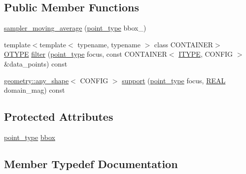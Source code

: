 \subsection*{Public Member Functions}
\begin{DoxyCompactItemize}
\item 
\hyperlink{classmui_1_1sampler__moving__average_a01579f1073f49e7104cc781e84754a65}{sampler\+\_\+moving\+\_\+average} (\hyperlink{classmui_1_1sampler__moving__average_ae687f5cbf78af76e22bf97845f386300}{point\+\_\+type} bbox\+\_\+)
\item 
{\footnotesize template$<$template$<$ typename, typename $>$ class C\+O\+N\+T\+A\+I\+N\+ER$>$ }\\\hyperlink{classmui_1_1sampler__moving__average_af5b1ae5cd60a907dbbd1f3fe978263dd}{O\+T\+Y\+PE} \hyperlink{classmui_1_1sampler__moving__average_aaa0a6bd405aaa2566d08397aa436dfd2}{filter} (\hyperlink{classmui_1_1sampler__moving__average_ae687f5cbf78af76e22bf97845f386300}{point\+\_\+type} focus, const C\+O\+N\+T\+A\+I\+N\+ER$<$ \hyperlink{classmui_1_1sampler__moving__average_a93946e297f6a01f4aad6297d4dc55662}{I\+T\+Y\+PE}, C\+O\+N\+F\+IG $>$ \&data\+\_\+points) const
\item 
\hyperlink{classmui_1_1geometry_1_1any__shape}{geometry\+::any\+\_\+shape}$<$ C\+O\+N\+F\+IG $>$ \hyperlink{classmui_1_1sampler__moving__average_ab9c5dc123972f1054a2811895419eff0}{support} (\hyperlink{classmui_1_1sampler__moving__average_ae687f5cbf78af76e22bf97845f386300}{point\+\_\+type} focus, \hyperlink{classmui_1_1sampler__moving__average_ace3d3dadc4a7ed5724076533634e6c41}{R\+E\+AL} domain\+\_\+mag) const
\end{DoxyCompactItemize}
\subsection*{Protected Attributes}
\begin{DoxyCompactItemize}
\item 
\hyperlink{classmui_1_1sampler__moving__average_ae687f5cbf78af76e22bf97845f386300}{point\+\_\+type} \hyperlink{classmui_1_1sampler__moving__average_a64a46fb3b030c557f1dd50b9f059c427}{bbox}
\end{DoxyCompactItemize}


\subsection{Member Typedef Documentation}
\mbox{\label{classmui_1_1sampler__moving__average_a9c2d6ff0743c06447c3224c32870d872}} 
